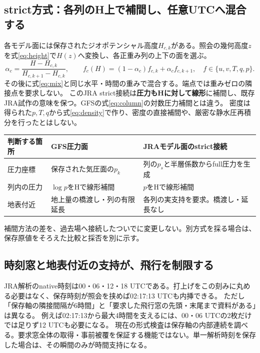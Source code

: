 \documentclass[11pt,a4paper]{article}
\begin{document}
\subsection{strict方式：各列のH上で補間し、任意UTCへ混合する}\label{th:jra-strict}
各モデル面には保存されたジオポテンシャル高度$H_{c,k}$がある。照会の幾何高度$z$を式\eqref{eq:height}で$H(z)$へ変換し、各正重み列の上下の面を選ぶ。
\begin{equation}
 \alpha_c=\frac{H-H_{c,k}}{H_{c,k+1}-H_{c,k}},\qquad
 f_c(H)=(1-\alpha_c)f_{c,k}+\alpha_c f_{c,k+1},
 \quad f\in\{u,v,T,q,p\}.
 \label{eq:jra-column}
\end{equation}
その後に式\eqref{eq:mix}と同じ水平・時間の重みで混合する。端点では重みゼロの隣接点を要求しない。
このJRA strict接続は\textbf{圧力もHに対して線形}に補間し、既存JRA試作の意味を保つ。GFSの式\eqref{eq:column}の対数圧力補間とは違う。
密度は得られた$p,T,q$から式\eqref{eq:density}で作り、密度の直接補間や、厳密な静水圧再積分を行ったとはしない。

\begin{center}\small
\begin{tabular}{@{}p{30mm}p{59mm}p{67mm}@{}}
\toprule 判断する箇所 & GFS圧力面 & JRAモデル面のstrict接続 \\\midrule
圧力座標 & 保存された気圧面の$p_k$ & 列の$p_s$と半層係数からfull圧力を生成 \\
列内の圧力 & $\log p$をHで線形補間 & $p$をHで線形補間 \\
地表付近 & 地上量の橋渡し・列の有限延長 & 各列の実支持を要求。橋渡し・延長なし \\\bottomrule
\end{tabular}
\end{center}
補間方法の差を、過去場へ接続したついでに変更しない。別方式を採る場合は、保存原値をそろえた比較と採否を別に示す。

\clearpage
\subsection{時刻窓と地表付近の支持が、飛行を制限する}\label{th:jra-support}
JRA解析のnative時刻は00・06・12・18 UTCである。打上げをこの刻みに丸める必要はなく、保存時刻が照会を挟めば02:17:13 UTCも内挿できる。
ただし「保存軸の隣接間隔が6時間」と「要求した飛行窓の先頭・末尾まで資料がある」は異なる。
例えば02:17:13から最大4時間を支えるには、00・06 UTCの2枚だけでは足りず12 UTCも必要になる。
現在の形式検査は保存軸の内部連続を調べる。要求窓全体の取得・事前被覆を保証する機能ではない。単一解析時刻を保存した場合は、その瞬間のみが時間支持になる。
\end{document}
